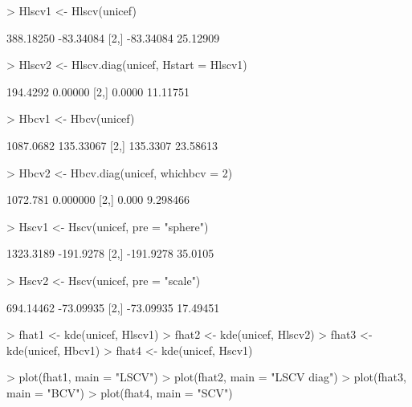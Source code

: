 \documentclass[a4paper,11pt]{article}
\begin{document}
\begin{Schunk}
\begin{Sinput}
> Hlscv1 <- Hlscv(unicef)
\end{Sinput}
\begin{Soutput}
          [,1]      [,2]
[1,] 388.18250 -83.34084
[2,] -83.34084  25.12909
\end{Soutput}
\begin{Sinput}
> Hlscv2 <- Hlscv.diag(unicef, Hstart = Hlscv1)
\end{Sinput}
\begin{Soutput}
         [,1]     [,2]
[1,] 194.4292  0.00000
[2,]   0.0000 11.11751
\end{Soutput}
\begin{Sinput}
> Hbcv1 <- Hbcv(unicef)
\end{Sinput}
\begin{Soutput}
          [,1]      [,2]
[1,] 1087.0682 135.33067
[2,]  135.3307  23.58613
\end{Soutput}
\begin{Sinput}
> Hbcv2 <- Hbcv.diag(unicef, whichbcv = 2)
\end{Sinput}
\begin{Soutput}
         [,1]     [,2]
[1,] 1072.781 0.000000
[2,]    0.000 9.298466
\end{Soutput}
\begin{Sinput}
> Hscv1 <- Hscv(unicef, pre = "sphere")
\end{Sinput}
\begin{Soutput}
          [,1]      [,2]
[1,] 1323.3189 -191.9278
[2,] -191.9278   35.0105
\end{Soutput}
\begin{Sinput}
> Hscv2 <- Hscv(unicef, pre = "scale")
\end{Sinput}
\begin{Soutput}
          [,1]      [,2]
[1,] 694.14462 -73.09935
[2,] -73.09935  17.49451
\end{Soutput}
\end{Schunk}
\begin{Schunk}
\begin{Sinput}
> fhat1 <- kde(unicef, Hlscv1)
> fhat2 <- kde(unicef, Hlscv2)
> fhat3 <- kde(unicef, Hbcv1)
> fhat4 <- kde(unicef, Hscv1)
\end{Sinput}
\end{Schunk}
\begin{Schunk}
\begin{Sinput}
> plot(fhat1, main = "LSCV")
> plot(fhat2, main = "LSCV diag")
> plot(fhat3, main = "BCV")
> plot(fhat4, main = "SCV")
\end{Sinput}
\end{Schunk}
\end{document}
